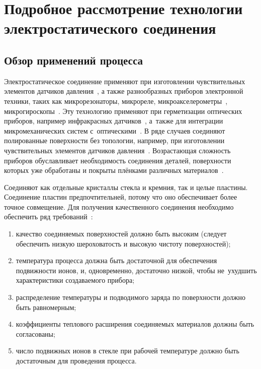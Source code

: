 \section{Подробное рассмотрение технологии электростатического соединения}

\subsection{Обзор применений процесса}

Электростатическое соединение применяют при изготовлении чувствительных элементов датчиков давления~\cite{kozin2010_microel_datch_fiz_vel}, а также разнообразных приборов электронной техники, таких как микрорезонаторы, микрореле, микроакселерометры~\cite{lit_Esashi_Wafer2008}, микрогироскопы~\cite{Rogers_current_limited_AB_2005}. Эту технологию применяют при герметизации оптических приборов, например инфракрасных датчиков~\cite{lit_Esashi_Wafer2008}, а~также для интеграции микромеханических систем с~оптическими~\cite{saran2003_ab_opt_fibers}. В ряде случаев соединяют полированные поверхности без топологии, например, при изготовлении чувствительных элементов датчиков давления~\cite{Andreev2013_Analiz_met_elektrostat_svar}. Возрастающая сложность приборов обуславливает необходимость соединения деталей, поверхности которых уже обработаны и покрыты плёнками различных материалов~\cite{Dragoi_cmos_wafer_bonding}.

Соединяют как отдельные кристаллы стекла и кремния, так и целые пластины. Соединение пластин предпочтительней, потому что оно обеспечивает более точное совмещение. Для получения качественного соединения необходимо обеспечить ряд требований~\cite{Low_temp_wafer_AB, Cozma_Puers_1995, Sinev_osoben_primen_inzh_vest201408}:
\begin{enumerate}[label=\asbuk*)]
    \item качество соединяемых поверхностей должно быть высоким (следует обеспечить
    низкую шероховатость и высокую чистоту поверхностей); %
    \item температура процесса должна быть достаточной для обеспечения
    подвижности ионов, и, одновременно, достаточно низкой, чтобы
    не~ухудшить характеристики создаваемого прибора;
    \item распределение температуры и подводимого заряда по
    поверхности должно быть равномерным;
    \item коэффициенты теплового расширения соединяемых материалов
    должны быть согласованы;
    \item число подвижных ионов в стекле при рабочей температуре
    должно быть достаточным для проведения процесса.
\end{enumerate}


